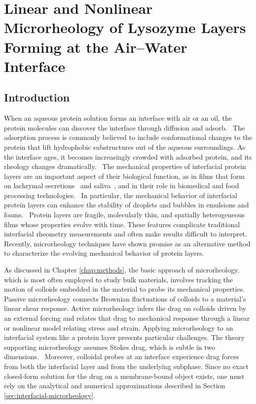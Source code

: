 
\chapter{\label{chap:lysozyme}Linear and Nonlinear Microrheology of Lysozyme Layers Forming at the Air--Water Interface}

\section{\label{sec:introduction}Introduction}

When an aqueous protein solution forms an interface with air or an oil, the protein molecules can discover the interface through diffusion and adsorb.~\cite{Walder2011}  The adsorption process is commonly believed to include conformational changes to the protein that lift hydrophobic substructures out of the aqueous surroundings. As the interface ages, it becomes increasingly crowded with adsorbed protein, and its rheology changes dramatically.~\cite{Murray2011a}
The mechanical properties of interfacial protein layers are an important aspect of their biological function, as in films that form on lachrymal secretions~\cite{Rosenfeld2013} and saliva~\cite{Proctor2005}, and in their role in biomedical and food processing technologies.~\cite{Murray2002}  In particular, the mechanical behavior of interfacial protein layers can enhance the stability of droplets and bubbles in emulsions and foams.~\cite{SaintJalmes2005,McClements2004}
Protein layers are fragile, molecularly thin, and spatially heterogeneous films whose properties evolve with time. These features complicate traditional interfacial rheometry measurements and often make results difficult to interpret.  Recently, microrheology techniques have shown promise as an alternative method to characterize the evolving mechanical behavior of protein layers.  

As discussed in Chapter \ref{chap:methods}, the basic approach of microrheology, which is most often employed to study bulk materials, involves tracking the motion of colloids embedded in the material to probe its mechanical properties.  Passive microrheology connects Brownian fluctuations of colloids to a material's linear shear response. Active microrheology infers the drag on colloids driven by an external forcing and relates that drag to mechanical response through a linear or nonlinear model relating stress and strain.
Applying microrheology to an interfacial system like a protein layer presents particular challenges. The theory supporting microrheology assumes Stokes drag, which is subtle in two dimensions.~\cite{Saffman1975} Moreover, colloidal probes at an interface experience drag forces from both the interfacial layer and from the underlying subphase. Since no exact closed-form solution for the drag on a membrane-bound object exists, one must rely on the analytical and numerical approximations described in Section \ref{sec:interfacial-microrheology}.

